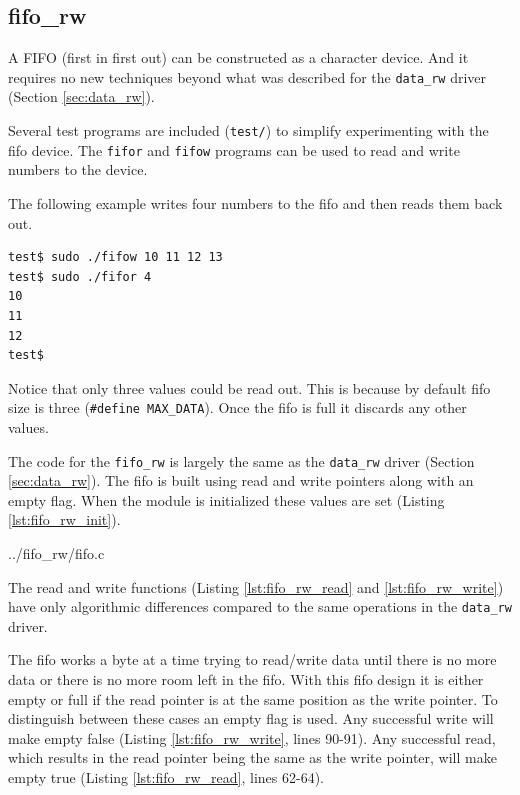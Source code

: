 \documentclass{article}
\begin{document}
\clearpage
\subsection{fifo\_rw}
\label{sec:fifo_rw}

A FIFO (first in first out) can be constructed as a character device.
And it requires no new techniques beyond what was described for
the \verb+data_rw+ driver (Section \ref{sec:data_rw}).

Several test programs are included (\verb+test/+) to simplify
experimenting with the fifo device.
The \verb+fifor+ and \verb+fifow+ programs can
be used to read and write numbers to the device.

The following example writes four numbers to the fifo and then
reads them back out.

\begin{verbatim}
test$ sudo ./fifow 10 11 12 13
test$ sudo ./fifor 4
10
11
12
test$
\end{verbatim}

Notice that only three values could be read out.
This is because by default fifo size is three (\verb+#define MAX_DATA+).
Once the fifo is full it discards any other values.

The code for the \verb+fifo_rw+ is largely the same as the \verb+data_rw+
driver (Section \ref{sec:data_rw}).
The fifo is built using read and write pointers along with an empty flag.
When the module is initialized these values are
set (Listing \ref{lst:fifo_rw_init}).


	{../fifo_rw/fifo.c}

The read and write functions
(Listing \ref{lst:fifo_rw_read} and \ref{lst:fifo_rw_write})
have only algorithmic differences compared to the same operations in the
\verb+data_rw+ driver.

The fifo works a byte at a time trying to read/write data until there
is no more data or there is no more room left in the fifo.
With this fifo design it is either empty or full if the read pointer
is at the same position as the write pointer.
To distinguish between these cases an empty flag is used.
Any successful write will make empty false
(Listing \ref{lst:fifo_rw_write}, lines 90-91).
Any successful read,
which results in the read pointer being the same as the write pointer,
will make empty true (Listing \ref{lst:fifo_rw_read}, lines 62-64).
\end{document}

